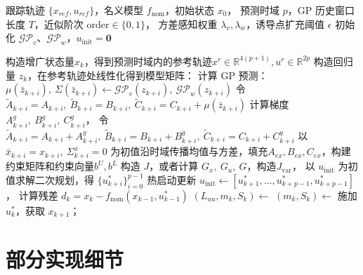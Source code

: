 \begin{algorithm}[htbp]
\caption{在线 GP-MPC 轨迹跟踪算法}
\label{alg:gp_mpc}
\begin{algorithmic}[1]
\Require 跟踪轨迹 $\{x_{ref}, u_{ref}\}$，名义模型 $f_{\mathrm{nom}}$，初始状态 $x_0$，
         预测时域 $p$，GP 历史窗口长度 $T$，近似阶次 $\mathrm{order} \in \{0, 1\}$，
         方差感知权重 $\lambda_v, \lambda_w$，诱导点扩充阈值 $\epsilon$
\State 初始化 $\mathcal{GP}_v$、$\mathcal{GP}_w$，$u_{\mathrm{init}} = \mathbf{0}$

    \State 构造增广状态量$x_k$，得到预测时域内的参考轨迹$x^r \in \mathbb R^{4 (p+1)}, u^r\in \mathbb R^{2 p}$
    \State 构造回归量 $z_k$，在参考轨迹处线性化得到模型矩阵：
        \State 计算 GP 预测：$\mu(\bar{z}_{k+i}),\ \Sigma(\bar{z}_{k+i}) \leftarrow \mathcal{GP}_v(z_{k+i}),\ \mathcal{GP}_w(z_{k+i})$
            \State 令 $\tilde{A}_{k+i} = A_{k+i},\ \tilde{B}_{k+i} = B_{k+i},\ \tilde{C}_{k+i} = C_{k+i} + \mu(\bar{z}_{k+i})$
        \Else
            \State 计算梯度 $A_{k+i}^g,\ B_{k+i}^g,\ C_{k+i}^g$，
                令 $\tilde{A}_{k+i} = A_{k+i} + A_{k+i}^g,\ \tilde{B}_{k+i} = B_{k+i} + B_{k+i}^g,\ \tilde{C}_{k+i} = C_{k+i} + C_{k+i}^g$
        \EndIf
        \State 以 $\bar{x}_{k+i} = x_{k+i},\ \Sigma_{k+i}^x = 0$ 为初值沿时域传播均值与方差，填充$A_{ex}, B_{ex}, C_{ex}$，构建
            约束矩阵和约束向量$b^U, b^L$
    \EndFor
    \State 构造 $J$，或者计算 $G_x,\ G_u,\ G$，构造$J_{\mathrm{var}}$，
           以 $u_{\mathrm{init}}$ 为初值求解二次规划，得 $\{u^*_{k+i}\}_{i=0}^{p-1}$
    \State 热启动更新 $u_{\mathrm{init}} \leftarrow [u^*_{k+1}, \ldots, u^*_{k+p-1}, u^*_{k+p-1}]$，
           计算残差 $d_k = x_k - f_{\mathrm{nom}}(x_{k-1}, u^*_{k-1})$
            \State $(L_{uu}, m_k, S_k) \leftarrow$
        \EndIf
        \State $(m_k, S_k) \leftarrow$
    \EndIf
    \State 施加 $u^*_k$，获取 $x_{k+1}$；
\EndFor
\end{algorithmic}
\end{algorithm}

\section{部分实现细节}

